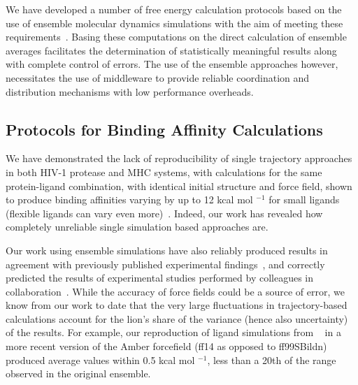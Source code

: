 \documentclass{bmcart}
\begin{document}
We have developed a number of free energy calculation protocols based on the
use of ensemble molecular dynamics simulations with the aim of meeting these
requirements~\cite{Sadiq2008, Sadiq2010, Wan2017brd4, Wan2017trk}. Basing
these computations on the direct calculation of ensemble averages facilitates
the determination of statistically meaningful results along with complete
control of errors. The use of the ensemble approaches however, necessitates
the use of middleware to provide reliable coordination and distribution
mechanisms with low performance overheads.


\subsection*{Protocols for Binding Affinity Calculations}

We have demonstrated the lack of reproducibility of single trajectory
approaches in both HIV-1 protease and MHC systems, with calculations for the
same protein-ligand combination, with identical initial structure and force
field, shown to produce binding affinities varying by up to 12 kcal mol
$^{-1}$ for small ligands (flexible ligands can vary even
more)~\cite{Wan2015, Sadiq2010, Wright2014}. Indeed, our work has revealed
how completely unreliable single simulation based approaches are.

Our work using ensemble simulations have also reliably produced results in
agreement with previously published experimental findings~\cite{Sadiq2010,
Wan2011, Wright2014, Bhati2017, Wan2017brd4, Wan2017trk}, and correctly
predicted the results of experimental studies performed by colleagues in
collaboration~\cite{Bunney2015}. While the accuracy of force fields could be a
source of error, we know from our work to date that the very large
fluctuations in trajectory-based calculations account for the lion’s share of
the variance (hence also uncertainty) of the results.
For example, our reproduction of ligand simulations from ~\cite{Wan2017brd4} in 
a more recent version of the Amber forcefield (ff14 as opposed to ff99SBildn) 
produced average values within 0.5 kcal mol $^{-1}$, less than a 20th of the range observed in the original ensemble.
\end{document}
